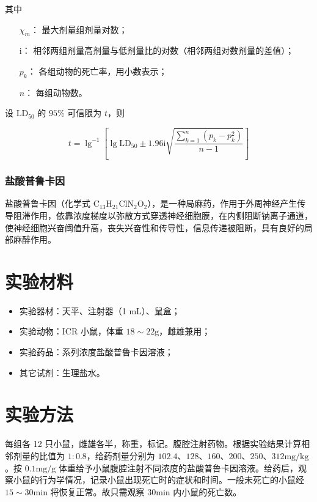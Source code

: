 \documentclass[UTF8]{ctexart}
\begin{document}
其中

\begin{itemize}
    \item [$\chi_m$：]最大剂量组剂量对数；
    \item [$\mathrm{i}$：]相邻两组剂量高剂量与低剂量比的对数（相邻两组对数剂量的差值）；
    \item [$p_k$：]各组动物的死亡率，用小数表示；
    \item [$n$：]每组动物数。
\end{itemize}

设 $\text{LD}_{50}$ 的 $95\%$ 可信限为 $t$，则

$$
    t=\lg^{-1}\left[\lg\text{LD}_{50}\pm 1.96\mathrm{i}\sqrt{\frac{\sum_{k=1}^{n}(p_k-p_k^2)}{n-1}}\right]
$$

\subsubsection{盐酸普鲁卡因}

盐酸普鲁卡因（化学式 $\text{C}_{13}\text{H}_{21}\text{Cl}\text{N}_2\text{O}_2$），是一种局麻药，作用于外周神经产生传导阻滞作用，依靠浓度梯度以弥散方式穿透神经细胞膜，在内侧阻断钠离子通道，使神经细胞兴奋阈值升高，丧失兴奋性和传导性，信息传递被阻断，具有良好的局部麻醉作用。

\section{实验材料}

\begin{itemize}
    \item 实验器材：天平、注射器（1 mL）、鼠盒；
    \item 实验动物：ICR 小鼠，体重 $18\sim 22\text{g}$，雌雄兼用；
    \item 实验药品：系列浓度盐酸普鲁卡因溶液；
    \item 其它试剂：生理盐水。
\end{itemize}

\section{实验方法}

每组各 12 只小鼠，雌雄各半，称重，标记。腹腔注射药物。根据实验结果计算相邻剂量的比值为 $1:0.8$，给药剂量分别为 $102.4$、$128$、$160$、$200$、$250$、$312\text{mg}/\text{kg}$。按 $0.1\text{mg}/\text{g}$ 体重给予小鼠腹腔注射不同浓度的盐酸普鲁卡因溶液。给药后，观察小鼠的行为学情况，记录小鼠出现死亡时的症状和时间。一般未死亡的小鼠经 $15\sim 30\text{min}$ 将恢复正常。故只需观察 $30\text{min}$ 内小鼠的死亡数。
\end{document}

